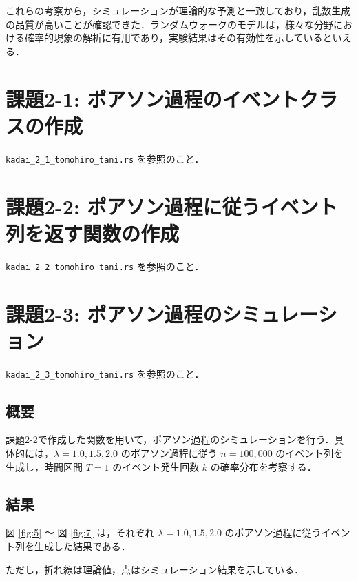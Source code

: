 \documentclass[fleqn, a4paper. 12pt]{jsarticle}
\begin{document}
    これらの考察から，シミュレーションが理論的な予測と一致しており，乱数生成の品質が高いことが確認できた．ランダムウォークのモデルは，様々な分野における確率的現象の解析に有用であり，実験結果はその有効性を示しているといえる．
    
  \newpage

  \section*{課題2-1: ポアソン過程のイベントクラスの作成}

    \texttt{kadai\_2\_1\_tomohiro\_tani.rs} を参照のこと．

  \newpage

  \section*{課題2-2: ポアソン過程に従うイベント列を返す関数の作成}

    \texttt{kadai\_2\_2\_tomohiro\_tani.rs} を参照のこと．

  \newpage

  \section*{課題2-3: ポアソン過程のシミュレーション}

    \texttt{kadai\_2\_3\_tomohiro\_tani.rs} を参照のこと．

    \subsection*{概要}

      課題2-2で作成した関数を用いて，ポアソン過程のシミュレーションを行う．具体的には，$\lambda = 1.0, 1.5, 2.0$ のポアソン過程に従う $n = 100,000$ のイベント列を生成し，時間区間 $T = 1$ のイベント発生回数 $k$ の確率分布を考察する．

    \subsection*{結果}

      図 \ref{fig:5} 〜 図 \ref{fig:7} は，それぞれ $\lambda = 1.0, 1.5, 2.0$ のポアソン過程に従うイベント列を生成した結果である．

      ただし，折れ線は理論値，点はシミュレーション結果を示している．
      
\end{document}
